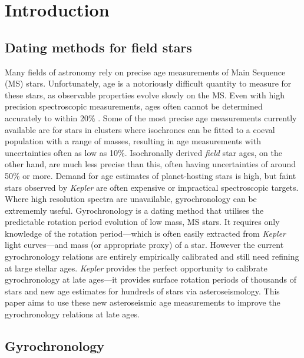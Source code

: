 \documentclass[11pt,preprint]{aastex}
\begin{document}
\section{Introduction}
\label{intro}
\subsection{Dating methods for field stars}

Many fields of astronomy rely on precise age measurements of Main Sequence
(MS) stars.
Unfortunately, age is a notoriously difficult quantity to measure for these
stars, as observable properties evolve slowly on the MS.
Even with high precision spectroscopic measurements, ages often cannot be
determined accurately to within 20\% \citep{Soderblom2010}.
Some of the most precise age measurements currently available are for stars in
clusters where isochrones can be fitted to a coeval population with a range of
masses, resulting in age measurements with uncertainties often as low as 10\%.
Isochronally derived {\it field} star ages, on the other hand, are much less
precise than this, often having uncertainties of around 50\% or more.
Demand for age estimates of planet-hosting stars is high, but faint stars
observed by {\it Kepler} are often expensive or impractical spectroscopic
targets.
Where high resolution spectra are unavailable, gyrochronology can be
extrememly useful.
Gyrochronology is a dating method that utilises the predictable rotation
period evolution of low mass, MS stars.
It requires only knowledge of the rotation period---which is often easily
extracted from {\it Kepler} light curves---and mass (or appropriate proxy) of
a star.
However the current gyrochronology relations are entirely empirically
calibrated and still need refining at large stellar ages.
{\it Kepler} provides the perfect opportunity to calibrate gyrochronology at
late ages---it provides surface rotation periods of thousands of stars and new
age estimates for hundreds of stars via asteroseismology.
This paper aims to use these new asteroseismic age measurements to improve the
gyrochronology relations at late ages.

\subsection{Gyrochronology}
\end{document}

